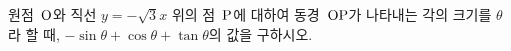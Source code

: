 원점~$\mathrm{O}$와 직선 $y=-\sqrt{3}x$ 위의 점~$\mathrm{P}$에 대하여 동경~$\mathrm{OP}$가 나타내는 각의 크기를 $\theta$라 할 때, $-\sin\theta+\cos\theta+\tan\theta$의 값을 구하시오. 
